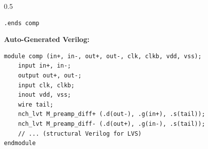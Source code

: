 \documentclass[aspectratio=169]{beamer}
\begin{document}
\begin{frame}[fragile]
\begin{columns}
\begin{column}{0.5\textwidth}
\begin{lstlisting}[basicstyle=\ttfamily\fontsize{3.5}{4.5}\selectfont]
.ends comp
      \end{lstlisting}
      \vspace{0.3em}
      \textbf{Auto-Generated Verilog:}
      \begin{lstlisting}[basicstyle=\ttfamily\fontsize{3.5}{4.5}\selectfont]
module comp (in+, in-, out+, out-, clk, clkb, vdd, vss);
    input in+, in-;
    output out+, out-;
    input clk, clkb;
    inout vdd, vss;
    wire tail;
    nch_lvt M_preamp_diff+ (.d(out-), .g(in+), .s(tail));
    nch_lvt M_preamp_diff- (.d(out+), .g(in-), .s(tail));
    // ... (structural Verilog for LVS)
endmodule
      \end{lstlisting}
    \end{column}
  \end{columns}
\end{frame}
\end{document}
